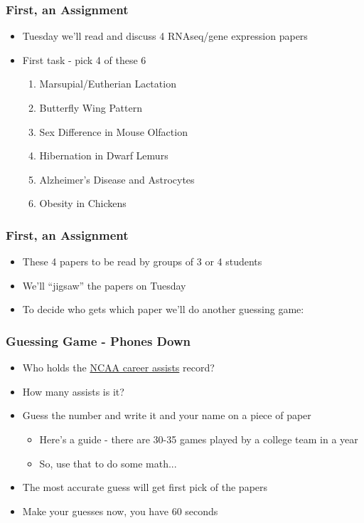 \documentclass[14pt]{beamer}
\begin{document}
\begin{frame}
\frametitle{First, an Assignment}
\begin{itemize}
	\item<+-> Tuesday we'll read and discuss 4 RNAseq/gene expression papers
	\item<+-> First task - pick 4 of these 6
	\begin{enumerate}
		\item<+-> Marsupial/Eutherian Lactation
		\item<+-> Butterfly Wing Pattern
		\item<+-> Sex Difference in Mouse Olfaction
		\item<+-> Hibernation in Dwarf Lemurs
		\item<+-> Alzheimer's Disease and Astrocytes
		\item<+-> Obesity in Chickens
	\end{enumerate}
\end{itemize}
\end{frame}

\begin{frame}
\frametitle{First, an Assignment}
\begin{itemize}
	\item<+-> These 4 papers to be read by groups of 3 or 4 students
	\item<+-> We'll ``jigsaw'' the papers on Tuesday
	\item<+-> To decide who gets which paper we'll do another guessing game:
\end{itemize}
\end{frame}

\begin{frame}
\frametitle{Guessing Game - Phones Down}
\begin{itemize}
	\item<+-> Who holds the \underline{NCAA career assists} record?
	\item<+-> How many assists is it?
	\item<+-> Guess the number and write it and your name on a piece of paper
	\begin{itemize}
		\item<+-> Here's a guide - there are 30-35 games played by a college team in a year
		\item<+-> So, use that to do some math...
	\end{itemize}
	\item<+-> The most accurate guess will get first pick of the papers
	\item<+-> Make your guesses now, you have 60 seconds 
\end{itemize}
\end{frame}
\end{document}
